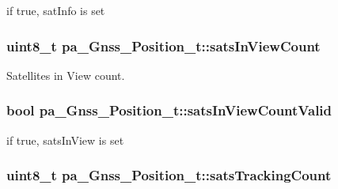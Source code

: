 if true, sat\+Info is set 

\subsubsection[{\texorpdfstring{sats\+In\+View\+Count}{satsInViewCount}}]{\setlength{\rightskip}{0pt plus 5cm}uint8\+\_\+t pa\+\_\+\+Gnss\+\_\+\+Position\+\_\+t\+::sats\+In\+View\+Count}\hypertarget{structpa___gnss___position__t_ae78a18b672129442eb309aec67faf1fa}{}\label{structpa___gnss___position__t_ae78a18b672129442eb309aec67faf1fa}


Satellites in View count. 

\subsubsection[{\texorpdfstring{sats\+In\+View\+Count\+Valid}{satsInViewCountValid}}]{\setlength{\rightskip}{0pt plus 5cm}bool pa\+\_\+\+Gnss\+\_\+\+Position\+\_\+t\+::sats\+In\+View\+Count\+Valid}\hypertarget{structpa___gnss___position__t_a28caf627c377231b98dad35d6277e03a}{}\label{structpa___gnss___position__t_a28caf627c377231b98dad35d6277e03a}


if true, sats\+In\+View is set 

\subsubsection[{\texorpdfstring{sats\+Tracking\+Count}{satsTrackingCount}}]{\setlength{\rightskip}{0pt plus 5cm}uint8\+\_\+t pa\+\_\+\+Gnss\+\_\+\+Position\+\_\+t\+::sats\+Tracking\+Count}\hypertarget{structpa___gnss___position__t_ab882bbea2e635ce5f3bda14a946d65ac}{}\label{structpa___gnss___position__t_ab882bbea2e635ce5f3bda14a946d65ac}


